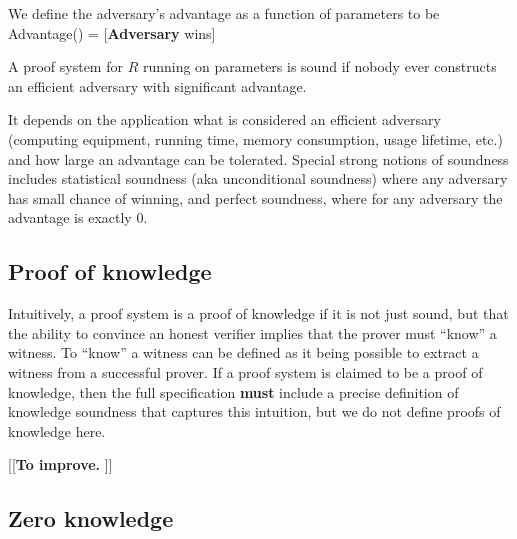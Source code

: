 We define the adversary’s advantage as a function of parameters to be \newline
\hphantom{We define the } Advantage(\params) = [\textbf{Adversary} wins]
 
A proof system for $R$ running on parameters is sound if nobody ever constructs an efficient adversary with significant advantage.
 
It depends on the application what is considered an efficient adversary (computing equipment, running time, memory consumption, usage lifetime, etc.) and how large an advantage can be tolerated. 
Special strong notions of soundness includes statistical soundness (aka unconditional soundness) where any adversary has small chance of winning, and perfect soundness, where for any adversary the advantage is exactly 0.


\subsection{Proof of knowledge}
\label{sec:security:defs-props:proof-of-knowledge}

 Intuitively, a proof system is a proof of knowledge if it is not just sound, but that the ability to convince an honest verifier implies that the prover must “know” a witness. 
To “know” a witness can be defined as it being possible to extract a witness from a successful prover. 
If a proof system is claimed to be a proof of knowledge, then the full specification \textbf{must} include a precise definition of knowledge soundness that captures this intuition, but we do not define proofs of knowledge here.


[[{\bfseries To improve.} 
	]]


\subsection{Zero knowledge}
\label{sec:security:defs-props:zero-knowledge}

